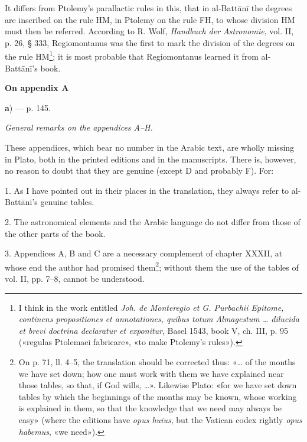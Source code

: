 \documentclass[11pt]{article}
\newcommand{\Pg}[1]{\marginpar{\footnotesize\color{gray}#1}}
\newcommand{\UnitHead}[2]{\par\setcounter{footnoteT}{0}\needspace{8\baselineskip}\bigskip\pdfbookmark[1]{#1}{unit-#2}\hypertarget{EN-#2}{}%
 {\large\bfseries\interlinepenalty=10000 #1\par}\nobreak\medskip}
\begin{document}
\par \Pg{I 322}It differs from Ptolemy's parallactic rules in this, that in al-Battānī the degrees are inscribed on the rule HM, in Ptolemy on the rule FH, to whose division HM must then be referred. According to R. Wolf, \emph{Handbuch der Astronomie}, vol. II, p. 26, § 333, Regiomontanus was the first to mark the division of the degrees on the rule HM\footnote{I think in the work entitled \emph{Joh. de Monteregio et G. Purbachii Epitome, continens propositiones et annotationes, quibus totum Almagestum … dilucida et brevi doctrina declaratur et exponitur}, Basel 1543, book V, ch. III, p. 95 («regulas Ptolemaei fabricare», «to make Ptolemy's rules»).}; it is most probable that Regiomontanus learned it from al-Battānī's book.\par
\UnitHead{On appendix A}{AA}
\par\begin{center}\textbf{a}) — p. 145.\end{center}
\par \emph{General remarks on the appendices A–H.}\par
\par These appendices, which bear no number in the Arabic text, are wholly missing in Plato, both in the printed editions and in the manuscripts. There is, however, no reason to doubt that they are genuine (except D and probably F). For:\par
\par 1. As I have pointed out in their places in the translation, they always refer to al-Battānī's genuine tables.\par
\par 2. The astronomical elements and the Arabic language do not differ from those of the other parts of the book.\par
\par 3. Appendices A, B and C are a necessary complement of chapter XXXII, at whose end the author had promised them\footnote{On p. 71, ll. 4–5, the translation should be corrected thus: «… of the months we have set down; how one must work with them we have explained near those tables, so that, if God wills, …». Likewise Plato: «for we have set down tables by which the beginnings of the months may be known, whose working is explained in them, so that the knowledge that we need may always be easy» (where the editions have \emph{opus huius}, but the Vatican codex rightly \emph{opus habemus}, «we need»).}; without them the use of the tables of vol. II, pp. 7–8, cannot be understood.\par
\end{document}

